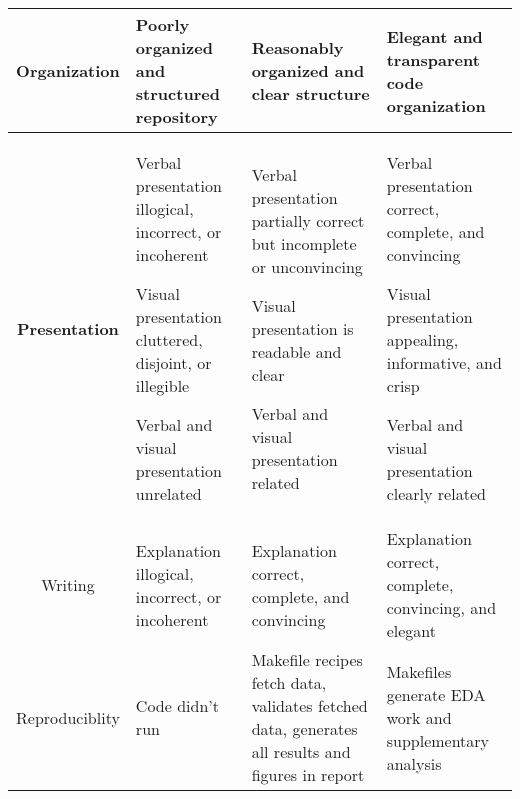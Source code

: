 \begin{tabular}{|>{\bf}c|>{\raggedright}p{4cm}|>{\raggedright}p{4cm}|>{\raggedright\arraybackslash}p{4cm}|}
Organization
 & 
Poorly organized and structured repository
 & 
Reasonably organized and clear structure
 & 
Elegant and transparent code organization
 \\
\hline

Presentation
 & 
Verbal presentation illogical, incorrect, or incoherent

Visual presentation cluttered, disjoint, or illegible

Verbal and visual presentation unrelated
 & 
Verbal presentation partially correct but incomplete or unconvincing

Visual presentation is readable and clear

Verbal and visual presentation related
 & 
Verbal presentation correct, complete, and convincing

Visual presentation appealing, informative, and crisp

Verbal and visual presentation clearly related
 \\
\hline

Writing
 & 
Explanation illogical, incorrect, or incoherent
 & 
Explanation correct, complete, and convincing
 & 
Explanation correct, complete, convincing, and elegant
 \\
\hline

Reproduciblity
 & 
Code didn't run
 & 
Makefile recipes fetch data, validates fetched data, generates all results and figures in report
 & 
Makefiles generate EDA work and supplementary analysis
 \\
\hline

\end{tabular}
